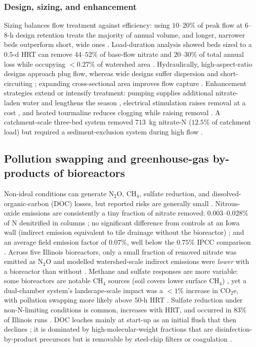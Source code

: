 \subsubsection{Design, sizing, and enhancement}

Sizing balances flow treatment against efficiency: using $10$--$20\%$ of
peak flow at $6$--$8$-h design retention treats the majority of annual volume,
and longer, narrower beds outperform short, wide ones
\parencite{Christianson2013}. Load-duration analysis showed beds sized to a
$0.5$-d HRT can remove $44$--$52\%$ of base-flow nitrate and $20$--$30\%$ of
total annual loss while occupying $<0.27\%$ of watershed area
\parencite{Moorman2015}. Hydraulically, high-aspect-ratio designs approach
plug flow, whereas wide designs suffer dispersion and short-circuiting
\parencite{deOliveira2023,Dougherty2020b}; expanding cross-sectional area
improves flow capture \parencite{Maxwell2022}. Enhancement strategies extend
or intensify treatment: pumping supplies additional nitrate-laden water and
lengthens the season \parencite{Hartfiel2023,DíazGarcía2025}, electrical
stimulation raises removal at a cost \parencite{Law2018}, and heated
tourmaline reduces clogging while raising removal \parencite{Ma2021}. A
catchment-scale three-bed system removed $713$~kg nitrate-N ($12.5\%$ of
catchment load) but required a sediment-exclusion system during high flow
\parencite{Feyereisen2023}.

\subsection{Pollution swapping and greenhouse-gas by-products of bioreactors}

Non-ideal conditions can generate N$_2$O, CH$_4$, sulfate reduction, and
dissolved-organic-carbon (DOC) losses, but reported risks are generally small
\parencite{Hartfiel2022}. Nitrous-oxide emissions are consistently a tiny
fraction of nitrate removed: $0.003$--$0.028\%$ of N denitrified in columns
\parencite{Greenan2009}; no significant difference from controls at an Iowa
wall (indirect emission equivalent to tile drainage without the bioreactor)
\parencite{Moorman2010}; and an average field emission factor of $0.07\%$,
well below the $0.75\%$ IPCC comparison \parencite{Bock2018}. Across five
Illinois bioreactors, only a small fraction of removed nitrate was emitted as
N$_2$O and modelled watershed-scale indirect emissions were \emph{lower} with
a bioreactor than without \parencite{Brunton2024}. Methane and sulfate
responses are more variable: some bioreactors are notable CH$_4$ sources
(soil covers lower surface CH$_4$) \parencite{Brunton2024}, yet a dual-chamber
system's landscape-scale impact was a $<1\%$ increase in CO$_2$e, with
pollution swapping more likely above $50$-h HRT \parencite{Hartfiel2023b}.
Sulfate reduction under non-N-limiting conditions is common, increases with
HRT, and occurred in $83\%$ of Illinois runs
\parencite{Bell2015,Povilaitis2020,Rivas2020}. DOC leaches mainly at
start-up as an initial flush that then declines
\parencite{Abusallout2017,Rivas2020,Greenan2009}; it is dominated by
high-molecular-weight fractions that are disinfection-by-product precursors
but is removable by steel-chip filters or coagulation \parencite{Abusallout2017}.

